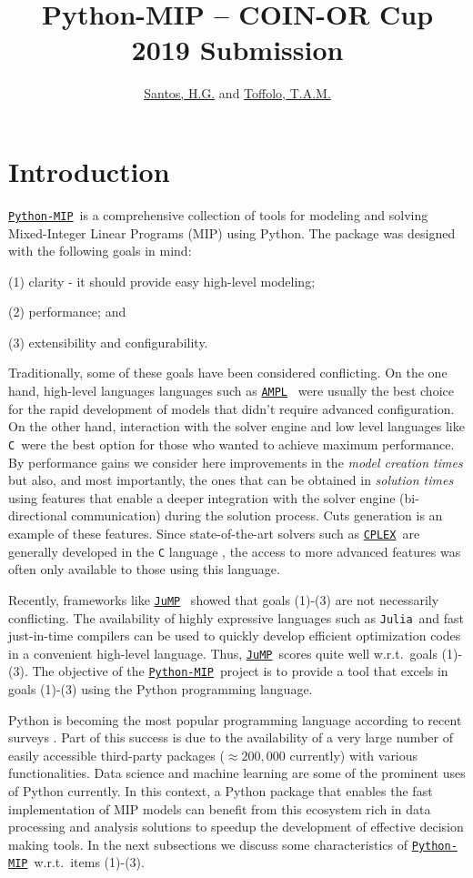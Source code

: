 \documentclass{article}
\title{Python-MIP -- COIN-OR Cup 2019 Submission }
\author{\href{http://www.decom.ufop.br/haroldo/}{Santos, H.G.} and \href{http://www.toffolo.com.br}{Toffolo, T.A.M.}}
\def\C{\texttt{C}}
\def\CPLEX{\href{https://www.ibm.com/analytics/cplex-optimizer}{\texttt{CPLEX}\textsuperscript{\textregistered}}}
\def\JuMP{\href{https://github.com/JuliaOpt/JuMP.jl}{\texttt{JuMP}}}
\def\Julia{\texttt{Julia}}
\def\PythonMIP{\href{https://github.com/coin-or/python-mip}{\texttt{Python-MIP}}}
\def\AMPL{\href{https://ampl.com}{\texttt{AMPL}}}
\begin{document}
\maketitle

\section{Introduction}

\PythonMIP\ is a comprehensive collection of tools for modeling and solving Mixed-Integer Linear Programs (MIP) using Python. 
The package was designed with the following goals in mind: 

(1) clarity - it should provide easy high-level modeling; 

(2) performance; and 

(3) extensibility and configurability.

\noindent Traditionally, some of these goals have been considered conflicting. 
On the one hand, high-level languages languages such as \AMPL\ \cite{Fourer1987} were usually the best choice for the rapid development of models that didn't require advanced configuration.
On the other hand, interaction with the solver engine and low level languages like \C\ were the best option for those who wanted to achieve maximum performance. 
By performance gains we consider here improvements in the \emph{model creation times} but also, and most importantly, the ones that can be obtained in \emph{solution times} using features that enable a deeper integration with the solver engine (bi-directional communication) during the solution process.
Cuts generation is an example of these features.
Since state-of-the-art solvers such as \CPLEX\ are generally developed in the \texttt{C} language \cite{Bixby2002}, the access to more advanced features was often only available to those using this language.

Recently, frameworks like \JuMP\ \cite{Dunning2015} showed that goals (1)-(3) are not necessarily conflicting.
The availability of highly expressive languages such as \Julia\ and fast just-in-time compilers can be used to quickly develop efficient optimization codes in a convenient high-level language. 
Thus, \JuMP\ scores quite well w.r.t.\ goals (1)-(3). 
The objective of the \PythonMIP\ project is to provide a tool that excels in goals (1)-(3) using the Python programming language.

Python is becoming the most popular programming language according to recent surveys \cite{Econ2018}. 
Part of this success is due to the availability of a very large number of easily accessible third-party packages ($\approx 200,000$ currently) with various functionalities. 
Data science and machine learning are some of the prominent uses of Python currently. 
In this context, a Python package that enables the fast implementation of MIP models can benefit from this ecosystem rich in data processing and analysis solutions to speedup the development of effective decision making tools. 
In the next subsections we discuss some characteristics of \PythonMIP\ w.r.t.\ items (1)-(3).
\end{document}
